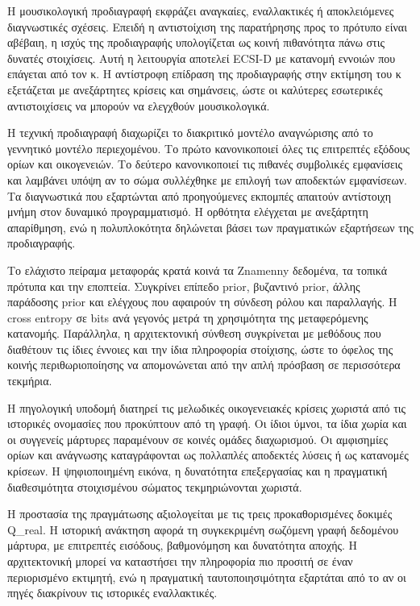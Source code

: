\documentclass[
  10pt,
  a4paper,
]{report}
\begin{document}
Η μουσικολογική προδιαγραφή εκφράζει αναγκαίες, εναλλακτικές ή
αποκλειόμενες διαγνωστικές σχέσεις. Επειδή η αντιστοίχιση της
παρατήρησης προς το πρότυπο είναι αβέβαιη, η ισχύς της προδιαγραφής
υπολογίζεται ως κοινή πιθανότητα πάνω στις δυνατές στοιχίσεις. Αυτή η
λειτουργία αποτελεί ECSI-D με κατανομή εννοιών που επάγεται από τον κ. Η
αντίστροφη επίδραση της προδιαγραφής στην εκτίμηση του κ εξετάζεται με
ανεξάρτητες κρίσεις και σημάνσεις, ώστε οι καλύτερες εσωτερικές
αντιστοιχίσεις να μπορούν να ελεγχθούν μουσικολογικά.

Η τεχνική προδιαγραφή διαχωρίζει το διακριτικό μοντέλο αναγνώρισης από
το γεννητικό μοντέλο περιεχομένου. Το πρώτο κανονικοποιεί όλες τις
επιτρεπτές εξόδους ορίων και οικογενειών. Το δεύτερο κανονικοποιεί τις
πιθανές συμβολικές εμφανίσεις και λαμβάνει υπόψη αν το σώμα συλλέχθηκε
με επιλογή των αποδεκτών εμφανίσεων. Τα διαγνωστικά που εξαρτώνται από
προηγούμενες εκπομπές απαιτούν αντίστοιχη μνήμη στον δυναμικό
προγραμματισμό. Η ορθότητα ελέγχεται με ανεξάρτητη απαρίθμηση, ενώ η
πολυπλοκότητα δηλώνεται βάσει των πραγματικών εξαρτήσεων της
προδιαγραφής.

Το ελάχιστο πείραμα μεταφοράς κρατά κοινά τα Znamenny δεδομένα, τα
τοπικά πρότυπα και την εποπτεία. Συγκρίνει επίπεδο prior, βυζαντινό
prior, άλλης παράδοσης prior και ελέγχους που αφαιρούν τη σύνδεση ρόλου
και παραλλαγής. Η cross entropy σε bits ανά γεγονός μετρά τη χρησιμότητα
της μεταφερόμενης κατανομής. Παράλληλα, η αρχιτεκτονική σύνθεση
συγκρίνεται με μεθόδους που διαθέτουν τις ίδιες έννοιες και την ίδια
πληροφορία στοίχισης, ώστε το όφελος της κοινής περιθωριοποίησης να
απομονώνεται από την απλή πρόσβαση σε περισσότερα τεκμήρια.

Η πηγολογική υποδομή διατηρεί τις μελωδικές οικογενειακές κρίσεις
χωριστά από τις ιστορικές ονομασίες που προκύπτουν από τη γραφή. Οι
ίδιοι ύμνοι, τα ίδια χωρία και οι συγγενείς μάρτυρες παραμένουν σε
κοινές ομάδες διαχωρισμού. Οι αμφισημίες ορίων και ανάγνωσης
καταγράφονται ως πολλαπλές αποδεκτές λύσεις ή ως κατανομές κρίσεων. Η
ψηφιοποιημένη εικόνα, η δυνατότητα επεξεργασίας και η πραγματική
διαθεσιμότητα στοιχισμένου σώματος τεκμηριώνονται χωριστά.

Η προστασία της πραγμάτωσης αξιολογείται με τις τρεις προκαθορισμένες
δοκιμές Q\_real. Η ιστορική ανάκτηση αφορά τη συγκεκριμένη σωζόμενη
γραφή δεδομένου μάρτυρα, με επιτρεπτές εισόδους, βαθμονόμηση και
δυνατότητα αποχής. Η αρχιτεκτονική μπορεί να καταστήσει την πληροφορία
πιο προσιτή σε έναν περιορισμένο εκτιμητή, ενώ η πραγματική
ταυτοποιησιμότητα εξαρτάται από το αν οι πηγές διακρίνουν τις ιστορικές
εναλλακτικές.
\end{document}
